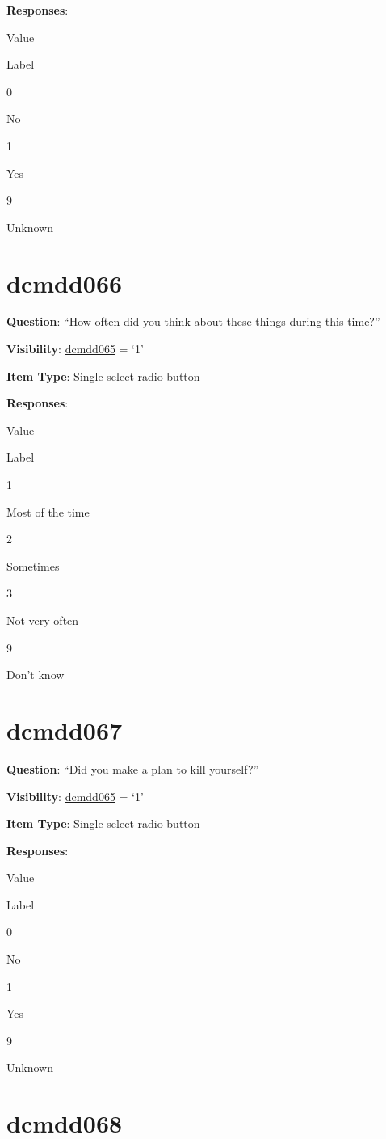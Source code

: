 \documentclass[]{book}
\begin{document}
\textbf{Responses}:

Value

Label

0

No

1

Yes

9

Unknown

\hypertarget{dcmdd066}{%
\section{dcmdd066}\label{dcmdd066}}

\textbf{Question}: ``How often did you think about these things during this time?''

\textbf{Visibility}: \protect\hyperlink{dcmdd065}{dcmdd065} = `1'

\textbf{Item Type}: Single-select radio button

\textbf{Responses}:

Value

Label

1

Most of the time

2

Sometimes

3

Not very often

9

Don't know

\hypertarget{dcmdd067}{%
\section{dcmdd067}\label{dcmdd067}}

\textbf{Question}: ``Did you make a plan to kill yourself?''

\textbf{Visibility}: \protect\hyperlink{dcmdd065}{dcmdd065} = `1'

\textbf{Item Type}: Single-select radio button

\textbf{Responses}:

Value

Label

0

No

1

Yes

9

Unknown

\hypertarget{dcmdd068}{%
\section{dcmdd068}\label{dcmdd068}}
\end{document}
